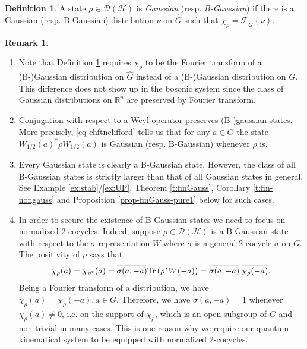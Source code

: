 \documentclass[12pt,reqno]{amsart}
\theoremstyle{definition}
\theoremstyle{definition}
\newtheorem{defn}[thm]{Definition}
\theoremstyle{definition}
\newtheorem{rem}[thm]{Remark}
\numberwithin{thm}{section}
\numberwithin{equation}{section}
\newcommand{\Real}{\mathbb R}
\newcommand{\F}{\mathcal{F}}
\newcommand{\Hi}{\mathcal{H}}
\newcommand{\mc}[1]{\mathcal #1}
\newcommand{\tr}{{\rm Tr}\,}
\newcommand{\wh}[1]{\widehat{#1}}
\begin{document}
\begin{defn}\label{d:Gauss} A state $\rho\in \mc D(\Hi)$ is \textit{Gaussian} (resp. \textit{B-Gaussian}) if there is a Gaussian (resp. B-Gaussian) distribution $\nu$ on $\widehat{G}$ such that $\chi_\rho = \F_{\wh{G}}(\nu)$.
\end{defn}

\begin{rem}\label{rem-normalized-is-needed}${}$
\begin{enumerate}
    \item Note that Definition \ref{d:Gauss} requires $\chi_{\rho}$ to be the Fourier transform of a (B-)Gaussian distribution on $\wh{G}$ instead of a (B-)Gaussian distribution on $G$. This difference does not show up in the bosonic system since the class of Gaussian distributions on $\Real^n$ are preserved by Fourier transform. %
    
    \item
    Conjugation with respect to a Weyl operator preserves (B-)gaussian states. More precisely, \eqref{eq-chftnclifford} tells us that for any $a\in G$ the state $W_{1/2}(a)^*\rho W_{1/2}(a)$ is Gaussian (resp. B-Gaussian) whenever $\rho$ is.
    
    \item Every Gaussian state is clearly a B-Gaussian state. However, the class of all B-Gaussian states is strictly larger than that of all Gaussian states in general. See Example \ref{ex:stab}/\ref{ex:UP}, Theorem \ref{t:finGauss}, Corollary \ref{t:fin-nongauss} and Proposition \ref{prop-finGauss-pure1}  below for such cases.
    
    \item In order to secure the existence of B-Gaussian states we need to focus on normalized 2-cocycles. Indeed, suppose $\rho\in \mc D(\Hi)$ is a B-Gaussian state with respect to the $\sigma$-representation $W$ where $\sigma$ is a general 2-cocycle $\sigma$ on $G$. The positivity of $\rho$ says that
        $$\chi_\rho(a)=\chi_{\rho^*}(a)=\overline{\sigma(a,-a)}\tr(\rho^* W(-a))=\overline{\sigma(a,-a)}\; \overline{\chi_{\rho}(-a)}.$$
    Being a Fourier transform of a distribution, we have $\chi_{\rho}(a)=\overline{\chi_{\rho}(-a)}, a\in G$. Therefore, we have $\sigma(a,-a)=1$ whenever $\chi_{\rho}(a)\neq 0$, i.e. on the support of $\chi_\rho$, which is an open subgroup of $G$ and non trivial in many cases. This is one reason why we require our quantum kinematical system to be equipped with normalized 2-cocycles.

\end{enumerate}

\end{rem}
\end{document}
